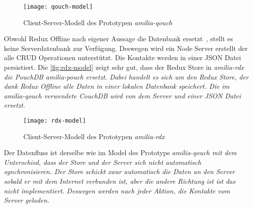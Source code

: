 \begin{figure}[H]
  \centering
  \texttt{[image: qouch-model]}
  \grayRule
  \caption{Client-Server-Modell des Prototypen \it{amilia-qouch}}
  \label{fig:qouch-model}
\end{figure}
%
Obwohl Redux Offline nach eigener Aussage die Datenbank ersetzt~\cite{redux-offline}, stellt es keine Serverdatenbank zur Verfügung.
Deswegen wird ein Node Server erstellt der alle \gls{CRUD} Operationen unterstützt. Die Kontakte werden in einer \gls{JSON} Datei persistiert.
Die \autoref{fig:rdx-model} zeigt sehr gut, dass der Redux Store in \it{amilia-rdx} die PouchDB \it{amilia-pouch} ersetzt.
Dabei handelt es sich um den Redux Store, der dank Redux Offline alle Daten in einer lokalen Datenbank speichert.
Die im \it{amilia-qouch} verwendete CouchDB wird von dem Server und einer \gls{JSON} Datei ersetzt.
%
\begin{figure}[H]
  \centering
  \texttt{[image: rdx-model]}
  \grayRule
  \caption{Client-Server-Modell des Prototypen \it{amilia-rdx}}
  \label{fig:rdx-model}
\end{figure}
% 
Der Datenfluss ist derselbe wie im Model des Prototyps \it{amilia-qouch} mit dem Unterschied, dass der Store und der Server sich nicht automatisch synchronisieren.
Der Store schickt zwar automatisch die Daten an den Server sobald er mit dem Internet verbunden ist, aber die andere Richtung ist ist das nicht implementiert.
Deswegen werden nach jeder Aktion, die Kontakte vom Server geladen.
